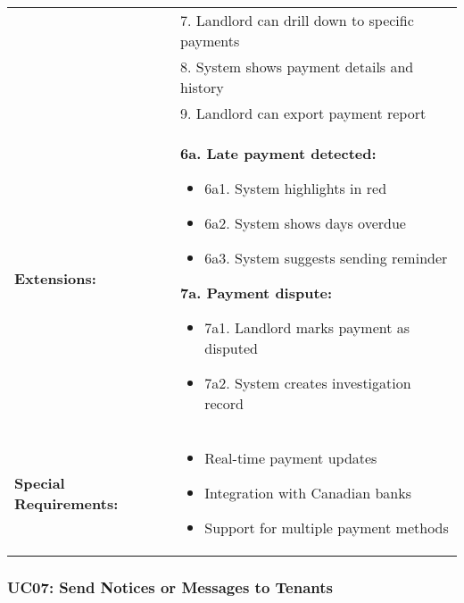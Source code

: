 \documentclass[12pt]{article}
\begin{document}
\begin{longtable}{|p{3cm}|p{11cm}|}
& 7. Landlord can drill down to specific payments \\
& 8. System shows payment details and history \\
& 9. Landlord can export payment report \\
\hline
\textbf{Extensions:} & 
\textbf{6a. Late payment detected:}
\begin{itemize}
    \item 6a1. System highlights in red
    \item 6a2. System shows days overdue
    \item 6a3. System suggests sending reminder
\end{itemize}
\textbf{7a. Payment dispute:}
\begin{itemize}
    \item 7a1. Landlord marks payment as disputed
    \item 7a2. System creates investigation record
\end{itemize} \\
\hline
\textbf{Special Requirements:} & 
\begin{itemize}
    \item Real-time payment updates
    \item Integration with Canadian banks
    \item Support for multiple payment methods
\end{itemize} \\
\hline
\end{longtable}

\subsubsection{UC07: Send Notices or Messages to Tenants}
\end{document}
